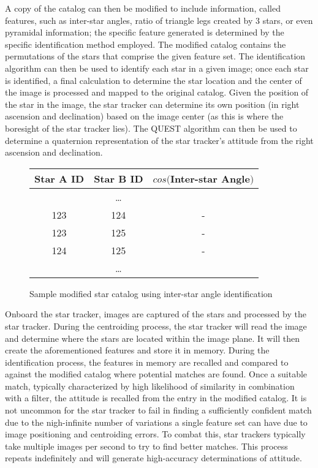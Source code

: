 \par \qquad A copy of the catalog can then be modified to include information, called features, such as inter-star angles, ratio of triangle legs created by 3 stars, or even pyramidal information; the specific feature generated is determined by the specific identification method employed.
The modified catalog contains the permutations of the stars that comprise the given feature set.
The identification algorithm can then be used to identify each star in a given image; once each star is identified, a final calculation to determine the star location and the center of the image is processed and mapped to the original catalog.
Given the position of the star in the image, the star tracker can determine its own position (in right ascension and declination) based on the image center (as this is where the boresight of the star tracker lies).
The QUEST algorithm can then be used to determine a quaternion representation of the star tracker's attitude from the right ascension and declination.

\begin{figure}[h]
    \begin{adjustbox}{center}
\begin{tabular}{|| c c c ||}
    \hline
    Star A ID & Star B ID & $cos($Inter-star Angle$)$ \\
    \hline\hline

    & \dots & \\ 
    \hline
    123 & 124 & - \\
    \hline
    123 & 125 & - \\
    \hline
    124 & 125 & - \\
    \hline
    & \dots & \\ 
    \hline

\end{tabular}
\end{adjustbox}
\caption{Sample modified star catalog using inter-star angle identification}
\end{figure}

\par \qquad Onboard the star tracker, images are captured of the stars and processed by the star tracker.
During the centroiding process, the star tracker will read the image and determine where the stars are located within the image plane.
It will then create the aforementioned features and store it in memory.
During the identification process, the features in memory are recalled and compared to against the modified catalog where potential matches are found.
Once a suitable match, typically characterized by high likelihood of similarity in combination with a filter, the attitude is recalled from the entry in the modified catalog.
It is not uncommon for the star tracker to fail in finding a sufficiently confident match due to the nigh-infinite number of variations a single feature set can have due to image positioning and centroiding errors.
To combat this, star trackers typically take multiple images per second to try to find better matches.
This process repeats indefinitely and will generate high-accuracy determinations of attitude.

